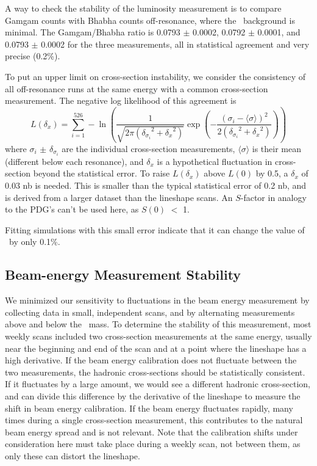 \documentclass[aps,prd,preprint,superscriptaddress,tightenlines,nofootinbib,floatfix]{revtex4}
\begin{document}
A way to check the stability of the luminosity measurement is to
compare Gamgam counts with Bhabha counts off-resonance, where the
\ups\ background is minimal.  The Gamgam/Bhabha ratio is 0.0793 $\pm$
0.0002, 0.0792 $\pm$ 0.0001, and 0.0793 $\pm$ 0.0002 for the three
measurements, all in statistical agreement and very precise (0.2\%).

To put an upper limit on cross-section instability, we consider the
consistency of all off-resonance runs at the same energy with a
common cross-section measurement.  The negative log likelihood of
this agreement is
\begin{equation}
  L(\delta_x) = \sum_{i=1}^{526} -\ln \left(\frac{1}{\sqrt{2\pi
  ({\delta_{\sigma_i}}^2 + {\delta_x}^2)}} \exp\left(-\frac{(\sigma_i
  - \langle\sigma\rangle)^2}{2 ({\delta_{\sigma_i}}^2 + {\delta_x}^2)}
  \right)\right)
\end{equation}
where $\sigma_i$ $\pm$ $\delta_{\sigma_i}$ are the individual
cross-section measurements, $\langle\sigma\rangle$ is their mean
(different below each resonance), and $\delta_x$ is a hypothetical
fluctuation in cross-section beyond the statistical error.  To raise
$L(\delta_x)$ above $L(0)$ by 0.5, a $\delta_x$ of 0.03 nb is needed.
This is smaller than the typical statistical error of 0.2 nb, and is
derived from a larger dataset than the lineshape scans.  An $S$-factor
in analogy to the PDG's can't be used here, as $S(0)$ $<$ 1.

Fitting simulations with this small error indicate that it can change
the value of \gee\ by only 0.1\%.

%
\subsection{Beam-energy Measurement Stability} \label{sec:energy}
%

We minimized our sensitivity to fluctuations in the beam energy
measurement by collecting data in small, independent scans, and by
alternating measurements above and below the \ups\ mass.  To determine
the stability of this measurement, most weekly scans included two
cross-section measurements at the same energy, usually near the
beginning and end of the scan and at a point where the lineshape has a
high derivative.  If the beam energy calibration does not fluctuate
between the two measurements, the hadronic cross-sections should be
statistically consistent.  If it fluctuates by a large amount, we
would see a different hadronic cross-section, and can divide this
difference by the derivative of the lineshape to measure the shift in
beam energy calibration.  If the beam energy fluctuates rapidly, many
times during a single cross-section measurement, this contributes to
the natural beam energy spread and is not relevant.  Note that the
calibration shifts under consideration here must take place during a
weekly scan, not between them, as only these can distort the
lineshape.
\end{document}
